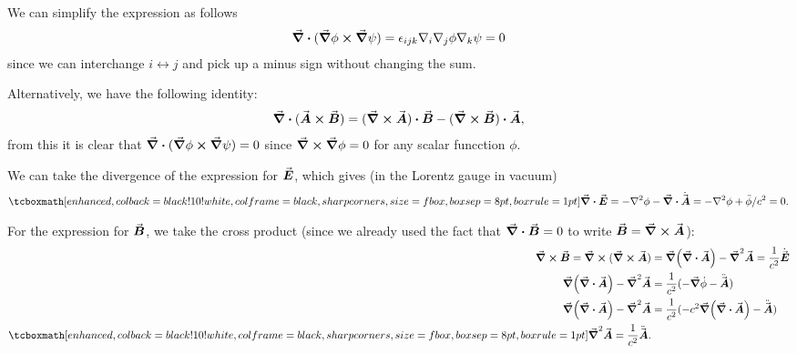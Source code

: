
We can simplify the expression as follows
\begin{eqnarray}
    \label{eq:div-cross-grads}
    \grad \vdot (\grad\phi \cross \grad\psi) = \epsilon_{ijk} \nabla_{i} \nabla_{j} \phi \nabla_{k}\psi = 0
\end{eqnarray}
since we can interchange $i \leftrightarrow j$ and pick up a minus sign without changing the sum.

Alternatively, we have the following identity:
\begin{eqnarray}
    \label{eq:alternative-method}
    \grad \vdot (\va*{A} \cross \va*{B}) = (\grad \cross \va*{A}) \vdot \va*{B} - (\grad \cross \va*{B}) \vdot \va*{A}
,\end{eqnarray}
from this it is clear that $\grad \vdot (\grad\phi \cross \grad\psi) = 0$ since $\grad \cross \grad\phi = 0$ for any scalar funcction $\phi$.


We can take the divergence of the expression for $\va*{E}$, which gives (in the Lorentz gauge in vacuum)
\begin{eqnarray}
    \label{eq:div-E}
    \eqbox{
    \grad \vdot \va*{E} = -\laplacian\phi - \grad \vdot \dot{\va*{A}} = -\laplacian\phi + \ddot{\phi}/c^2 = 0
}
.\end{eqnarray}

For the expression for $\va*{B}$, we take the cross product (since we already used the fact that $\grad \vdot \va*{B} = 0$ to write $\va*{B} = \grad \cross \va*{A}$):
\begin{align}
    \label{eq:curl-B}
    \grad \cross \va*{B} = \grad \cross (\grad \cross \va*{A}) &= \grad(\grad \vdot \va*{A}) - \grad^2\va*{A} = \frac{1}{c^2}\dot{\va*{E}} \notag \\
    \grad(\grad \vdot \va*{A}) - \grad^2 \va*{A} &= \frac{1}{c^2} (-\grad\dot{\phi} - \ddot{\va*{A}}) \notag \\
    \grad(\grad \vdot \va*{A}) - \grad^2 \va*{A} &= \frac{1}{c^2} (-c^2\grad(\grad \vdot \va*{A}) - \ddot{\va*{A}}) \notag \\
    \eqbox{\grad^2 \va*{A} = \frac{1}{c^2}\ddot{\va*{A}}}
.\end{align}
 





